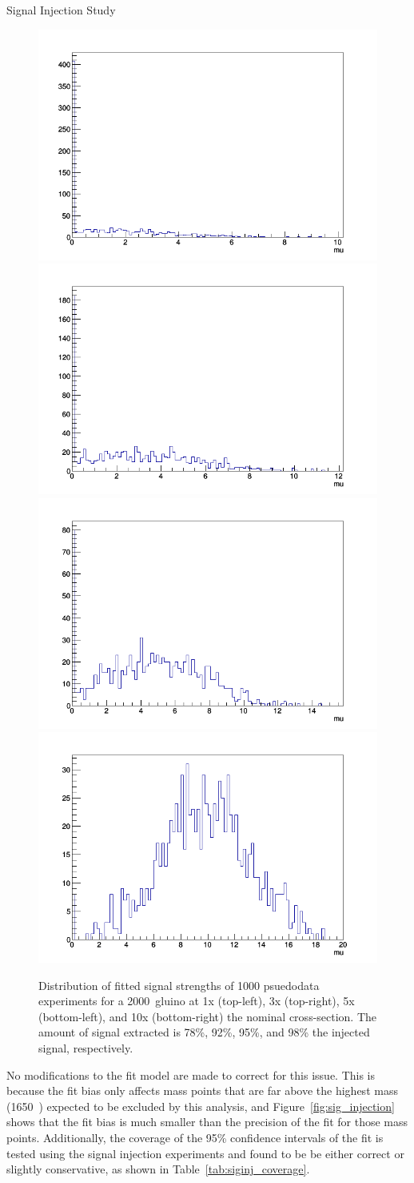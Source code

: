 \begin{section}{Signal Injection Study}
\begin{figure}[tbp!]
\centering
\includegraphics[angle=0,width=0.45\columnwidth]{fig/siginj_bias_1x.png}
\includegraphics[angle=0,width=0.45\columnwidth]{fig/siginj_bias_3x.png}
\includegraphics[angle=0,width=0.45\columnwidth]{fig/siginj_bias_5x.png}
\includegraphics[angle=0,width=0.45\columnwidth]{fig/siginj_bias_10x.png}
\caption{Distribution of fitted signal strengths of 1000 psuedodata experiments for a 2000~\GeV gluino at 1x (top-left), 3x (top-right), 5x (bottom-left), and 10x (bottom-right) the nominal cross-section.
The amount of signal extracted is 78\%, 92\%, 95\%, and 98\% the injected signal, respectively.}
\label{fig:siginj_bias_study}
\end{figure}

No modifications to the fit model are made to correct for this issue.
This is because the fit bias only affects mass points that are far above the highest mass (1650~\GeV) expected to be excluded by this analysis, and Figure~\ref{fig:sig_injection} shows that the fit bias is much smaller than the precision of the fit for those mass points.
Additionally, the coverage of the 95\% confidence intervals of the fit is tested using the signal injection experiments and found to be be either correct or slightly conservative, as shown in Table~\ref{tab:siginj_coverage}.


\end{section}
